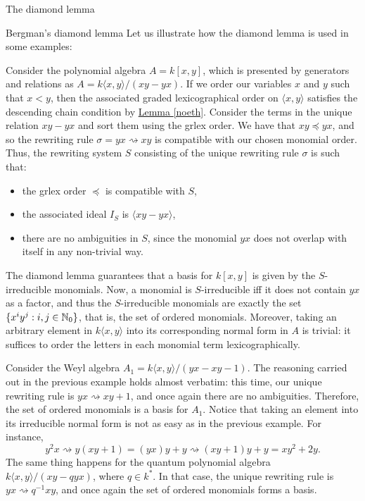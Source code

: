 \begin{chapter}{The diamond lemma}
\begin{section}{Bergman's diamond lemma}
Let us illustrate how the diamond lemma is used in some examples:

\begin{exmp} Consider the polynomial algebra $A=k[x,y]$, which is presented by generators and relations as $A=k\langle x,y\rangle/(xy-yx)$. If we order our variables $x$ and $y$ such that $x<y$, then the associated graded lexicographical order on $\langle x,y\rangle$ satisfies the descending chain condition by \hyperref[noeth]{Lemma \ref*{noeth}}. Consider the terms in the unique relation $xy-yx$ and sort them using the grlex order. We have that $xy\preceq yx$, and so the rewriting rule $\sigma=yx\rightsquigarrow xy$ is compatible with our chosen monomial order. Thus, the rewriting system $S$ consisting of the unique rewriting rule $\sigma$ is such that:
\begin{itemize}
\item the grlex order $\preceq$ is compatible with $S$,
\item the associated ideal $I_S$ is $\langle xy-yx\rangle$,
\item there are no ambiguities in $S$, since the monomial $yx$ does not overlap with itself in any non-trivial way.
\end{itemize}
The diamond lemma guarantees that a basis for $k[x,y]$ is given by the $S$-irreducible monomials. Now, a monomial is $S$-irreducible iff it does not contain $yx$ as a factor, and thus the $S$-irreducible monomials are exactly the set $\{x^iy^j:i,j\in\mathbb{N}_0\}$, that is, the set of ordered monomials.
Moreover, taking an arbitrary element in $k\langle x,y\rangle$ into its corresponding normal form in $A$ is trivial: it suffices to order the letters in each monomial term lexicographically.
\end{exmp}
\begin{exmp} Consider the Weyl algebra $A_1 = k\langle x,y\rangle/(yx-xy-1)$. The reasoning carried out in the previous example holds almost verbatim: this time, our unique rewriting rule is $yx\rightsquigarrow xy + 1$, and once again there are no ambiguities. Therefore, the set of ordered monomials is a basis for $A_1$. Notice that taking an element into its irreducible normal form is not as easy as in the previous example. For instance, 
\[y^2x\rightsquigarrow y(xy+1) = (yx)y +y \rightsquigarrow (xy+1)y + y =xy^2 +2y.\]
The same thing happens for the quantum polynomial algebra $k\langle x,y\rangle/(xy-qyx)$, where $q\in k^*$. In that case, the unique rewriting rule is $yx\rightsquigarrow q^{-1}xy$, and once again the set of ordered monomials forms a basis.

\end{exmp}
\end{section}
\end{chapter}
